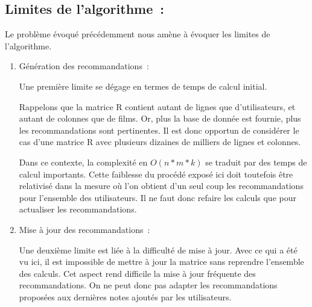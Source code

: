 \documentclass{article}
\begin{document}
\subsection{Limites de l’algorithme :}
\label{sec:org3285ae0}
Le problème évoqué précédemment nous amène à évoquer les limites de l’algorithme.
\begin{enumerate}
\item Génération des recommandations :
\label{sec:orgad7243e}

Une première limite se dégage en termes de temps de calcul initial.

Rappelons que la matrice R contient autant de lignes que d’utilisateurs, et
autant de colonnes que de films. Or, plus la base de donnée est fournie, plus
les recommandations sont pertinentes. Il est donc opportun de considérer le cas
d’une matrice R avec plusieurs dizaines de milliers de lignes et colonnes.

Dans ce contexte, la complexité en \(O(n*m*k)\) se traduit par des temps de calcul
importants. Cette faiblesse du procédé exposé ici doit toutefois être
relativisé dans la mesure où l’on obtient d’un seul coup les recommandations
pour l’ensemble des utilisateurs. Il ne faut donc refaire les calculs que pour
actualiser les recommandations.

\item Mise à jour des recommandations :
\label{sec:orgd9ed3c8}

Une deuxième limite est liée à la difficulté de mise à jour. Avec ce qui a été
 vu ici, il est impossible de mettre à jour la matrice sans reprendre l’ensemble
 des calculs. Cet aspect rend difficile la mise à jour fréquente des
 recommandations. On ne peut donc pas adapter les recommandations proposées aux
 dernières notes ajoutés par les utilisateurs.
\end{enumerate}
\end{document}
